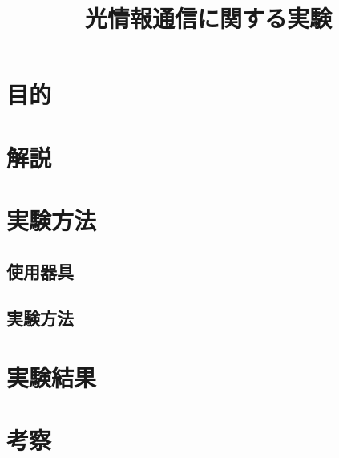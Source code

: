 \documentclass{ltjsarticle}
\title{光情報通信に関する実験}
\begin{document}
\maketitle

\section{目的}

\section{解説}
	\subsection{}
	\subsection{}
\section{実験方法}
	\subsection{使用器具}
	\subsection{実験方法}
\section{実験結果}
\section{考察}
\begin{thebibliography}{99}

\end{thebibliography}
\end{document}
